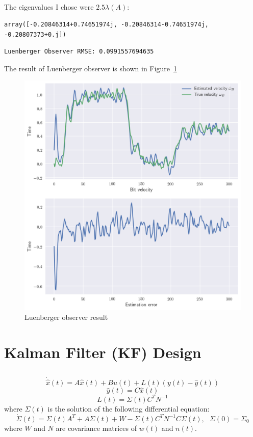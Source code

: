 \documentclass[12pt]{article}
\begin{document}
\subsection{}
The eigenvalues I chose were $2.5\lambda(A)$:
\begin{Verbatim}
array([-0.20846314+0.74651974j, -0.20846314-0.74651974j, -0.20807373+0.j])
\end{Verbatim}

\begin{Verbatim}
Luenberger Observer RMSE: 0.0991557694635
\end{Verbatim}
The result of Luenberger observer is shown in Figure~\ref{fig:4}
\begin{figure}[H]
	\centering
	\includegraphics[width=\linewidth]{4.png}      
	\caption{Luenberger observer result}
	\label{fig:4}
\end{figure}
\newpage
\section{Kalman Filter (KF) Design}
\subsection{}
\begin{equation}
\dot{\hat x}(t)=A\hat x(t)+Bu(t)+L(t)(y(t)-\hat y(t))
\end{equation}
\begin{equation}
\hat y(t)=C\hat x(t)
\end{equation}
\begin{equation}
L(t)=\Sigma(t)C^TN^{-1}
\end{equation}
where $\Sigma(t)$ is the solution of the following differential equation:
\begin{equation}
\dot\Sigma(t)=\Sigma(t)A^T+A\Sigma(t)+W-\Sigma(t)C^TN^{-1}C\Sigma(t),\ \ \ \Sigma(0)=\Sigma_0
\end{equation}
where $W$ and $N$ are covariance matrices of $w(t)$ and $n(t)$.
\end{document}
